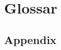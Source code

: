 \documentclass[oneside,bibliography=totocnumbered,BCOR=5mm]{scrbook}
\begin{document}
\chapter{Glossar}
\begin{appendix}
\chapter{Appendix}

%
%
%
\newpage
\thispagestyle{empty}
\noindent


\end{appendix}
\end{document}
